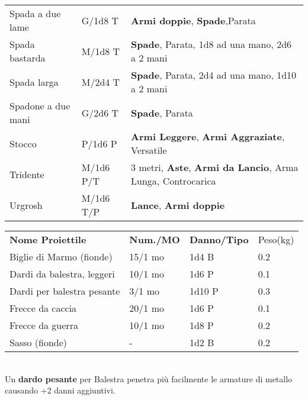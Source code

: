\documentclass[landscape,10pt,a4paper]{article}
\begin{document}
\begin{multicols}{2}
\begin{dmbox}[title=Armi - pagina \pageref{equipaggiamentoarmi}]
{\begin{tabularx}{1\linewidth}{lll}
Spada a due lame& G/1d8 T& \textbf{Armi doppie}, \textbf{Spade},Parata\\
Spada bastarda& M/1d8 T&\textbf{Spade}, Parata, 1d8 ad una mano, 2d6 a 2 mani\\
Spada larga& M/2d4 T&\textbf{Spade}, Parata, 2d4 ad una mano, 1d10 a 2 mani\\
Spadone a due mani& G/2d6 T&\textbf{Spade}, Parata\\
Stocco& P/1d6 P& \textbf{Armi Leggere}, \textbf{Armi Aggraziate}, Versatile\\
Tridente& M/1d6 P/T& 3 metri, \textbf{Aste}, \textbf{Armi da Lancio}, Arma Lunga, Controcarica\\
Urgrosh& M/1d6 T/P& \textbf{Lance}, \textbf{Armi doppie}
\end{tabularx}}
\end{dmbox}


\begin{dmbox}[title=Proiettili - pagina \pageref{proiettili}]

\begin{tabular}{llll}
\textbf{Nome Proiettile}   & \textbf{Num./MO} & \textbf{Danno/Tipo} & Peso(kg) \\
Biglie di Marmo (fionde)   & 15/1 mo                    & 1d4 B               & 0.2      \\
Dardi da balestra, leggeri & 10/1 mo                    & 1d6 P               & 0.1      \\
Dardi per balestra pesante & 3/1 mo                     & 1d10 P              & 0.3      \\
Frecce da caccia           & 20/1 mo                    & 1d6 P               & 0.1      \\
Frecce da guerra           & 10/1 mo                    & 1d8 P               & 0.2      \\
Sasso (fionde)             & -                          & 1d2 B               & 0.2      \\
\end{tabular}\\

Un \textbf{dardo pesante} per Balestra penetra più facilmente le armature di metallo causando +2 danni aggiuntivi.

\end{dmbox}



\end{multicols}
\end{document}
